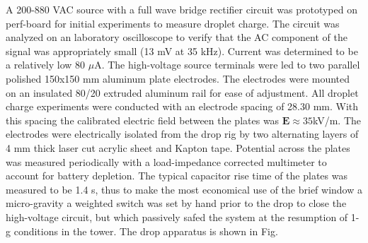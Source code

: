 \documentclass[a4paper, 12pt]{article}
\begin{document}
A 200-880 VAC source with a full wave bridge rectifier circuit was prototyped on perf-board for initial experiments to measure droplet charge. The circuit was analyzed on an laboratory oscilloscope to verify that the AC component of the signal was appropriately small (13 mV at 35 kHz). Current was determined to be a relatively low 80 $\mu$A. The high-voltage source terminals were led to two parallel polished 150x150 mm aluminum plate electrodes. The electrodes were mounted on an insulated 80/20 extruded aluminum rail for ease of adjustment. All droplet charge experiments were conducted with an electrode spacing of 28.30 mm. With this spacing the calibrated electric field between the plates was $\mathbf{E} \approx 35$kV/m. The electrodes were electrically isolated from the drop rig by two alternating layers of 4 mm thick laser cut acrylic sheet and Kapton tape. Potential across the plates was measured periodically with a load-impedance corrected multimeter to account for battery depletion. The typical capacitor rise time of the plates was measured to be 1.4 s, thus to make the most economical use of the brief window a micro-gravity a weighted switch was set by hand prior to the drop to close the high-voltage circuit, but which passively safed the system at the resumption of 1-g conditions in the tower. The drop apparatus is shown in Fig.



\end{document}
